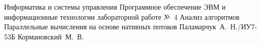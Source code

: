 
\makereporttitle
    {Информатика и системы управления} %
    {Программное обеспечение ЭВМ и информационные технологии} %
    {лабораторной работе №~4} %
    {Анализ алгоритмов} %
    {Параллельные вычисления на основе нативных потоков} %
    {} %
    {Паламарчук~А.~Н./ИУ7-53Б} %
    {Кормановский~М.~В.} %
